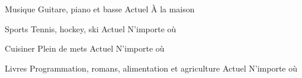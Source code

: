 \begin{cvhonors}
  \cvhonor
    {Musique} %
    {Guitare, piano et basse} %
    {Actuel} %
    {À la maison} %

  \cvhonor
    {Sports} %
    {Tennis, hockey, ski} %
    {Actuel} %
    {N'importe où} %

  \cvhonor
    {Cuisiner} %
    {Plein de mets} %
    {Actuel} %
    {N'importe où} %

  \cvhonor
    {Livres} %
    {Programmation, romans, alimentation et agriculture} %
    {Actuel} %
    {N'importe où} %
\end{cvhonors}
